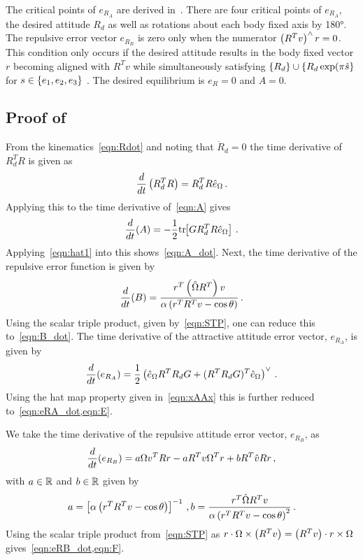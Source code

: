\documentclass[letterpaper, 10 pt, conference]{ieeeconf}  %
\begin{document}
The critical points of \( e_{R_A} \) are derived in~\cite{bullo2004}.
There are four critical points of \( e_{R_A} \), the desired attitude \( R_d \) as well as rotations about each body fixed axis by \ang{180}.
The repulsive error vector \( e_{R_{B}} \) is zero only when the numerator \( \left( R^T v \right)^\wedge r = 0 \). 
This condition only occurs if the desired attitude results in the body fixed vector \( r \) becoming aligned with \(R^T v \) while simultaneously satisfying \(\left\{ R_d \right\} \cup \left\{ R_d \exp(\pi \hat{s} \right\} \) for \( s \in \left\{ e_1, e_2, e_3 \right\} \) .
The desired equilibrium is \( e_R = 0 \) and \( A = 0\).

\subsection{Proof of~}\label{proof:error_dyn}
From the kinematics~\cref{eqn:Rdot} and noting that \( \dot{R}_d = 0 \) the time derivative of \( R_d^T R \) is given as
\begin{gather*}
	\frac{d }{d t} \left( R_d^T R \right) = R_d^T R \hat{e}_\Omega \, .
\end{gather*}
Applying this to the time derivative of~\cref{eqn:A} gives
\begin{gather*}
	\frac{d }{d t} (A) = -\frac{1}{2} \mathrm{tr}\negthickspace\left[ G R_d^T R \hat{e}_\Omega \right] \, .
\end{gather*}
Applying~\cref{eqn:hat1} into this shows~\cref{eqn:A_dot}.
Next, the time derivative of the repulsive error function is given by
\begin{gather*}
	\frac{d }{d t} (B) = \frac{r^T \left( \hat{\Omega} R^T \right) v}{\alpha \left( r^T R^T v - \cos \theta \right)} \, .
\end{gather*}
Using the scalar triple product, given by~\cref{eqn:STP}, one can reduce this to~\cref{eqn:B_dot}.
The time derivative of the attractive attitude error vector, \( e_{R_A} \), is given by
\begin{gather*}
	\frac{d }{d t} ( e_{R_A}) = \frac{1}{2} \left( \hat{e}_\Omega R^T R_d G + (R^T R_d G)^T \hat{e}_\Omega \right)^\vee \, .
\end{gather*}
Using the hat map property given in~\cref{eqn:xAAx} this is further reduced to~\cref{eqn:eRA_dot,eqn:E}.

We take the time derivative of the repulsive attitude error vector, \( e_{R_B} \), as
\begin{gather*}
	\frac{d }{d t}( e_{R_B} )= a \Omega v^T R r - a R^T v \Omega^T r + b R^T \hat{v} R r \, ,
\end{gather*}
with \( a \in \mathbb{R} \) and \( b \in \mathbb{R}\) given by 
\begin{gather*}
	a = \left[ \alpha \left( r^T R^T v - \cos \theta \right) \right]^{-1} \, ,
	b = \frac{r^T \hat{\Omega} R^T v}{\alpha \left( r^T R^T v - \cos \theta \right)^2} \, .
\end{gather*}
Using the scalar triple product from~\cref{eqn:STP} as \( r \cdot \Omega \times \left( R^T v \right) = \left( R^T v \right) \cdot r \times \Omega \) gives~\cref{eqn:eRB_dot,eqn:F}.
\end{document}
